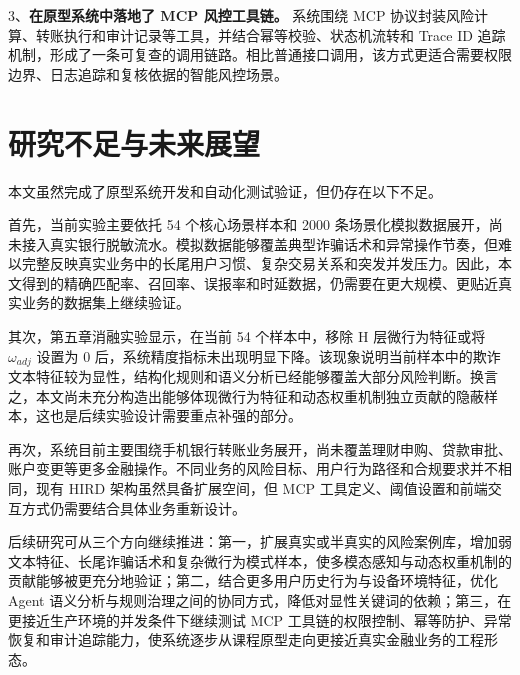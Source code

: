 \documentclass{xduugthesis}
\begin{document}
3、\textbf{在原型系统中落地了 MCP 风控工具链。} 系统围绕 MCP 协议封装风险计算、转账执行和审计记录等工具，并结合幂等校验、状态机流转和 Trace ID 追踪机制，形成了一条可复查的调用链路。相比普通接口调用，该方式更适合需要权限边界、日志追踪和复核依据的智能风控场景。

\section{研究不足与未来展望}

本文虽然完成了原型系统开发和自动化测试验证，但仍存在以下不足。

首先，当前实验主要依托 54 个核心场景样本和 2000 条场景化模拟数据展开，尚未接入真实银行脱敏流水。模拟数据能够覆盖典型诈骗话术和异常操作节奏，但难以完整反映真实业务中的长尾用户习惯、复杂交易关系和突发并发压力。因此，本文得到的精确匹配率、召回率、误报率和时延数据，仍需要在更大规模、更贴近真实业务的数据集上继续验证。

其次，第五章消融实验显示，在当前 54 个样本中，移除 H 层微行为特征或将 $\omega_{adj}$ 设置为 0 后，系统精度指标未出现明显下降。该现象说明当前样本中的欺诈文本特征较为显性，结构化规则和语义分析已经能够覆盖大部分风险判断。换言之，本文尚未充分构造出能够体现微行为特征和动态权重机制独立贡献的隐蔽样本，这也是后续实验设计需要重点补强的部分。

再次，系统目前主要围绕手机银行转账业务展开，尚未覆盖理财申购、贷款审批、账户变更等更多金融操作。不同业务的风险目标、用户行为路径和合规要求并不相同，现有 HIRD 架构虽然具备扩展空间，但 MCP 工具定义、阈值设置和前端交互方式仍需要结合具体业务重新设计。

后续研究可从三个方向继续推进：第一，扩展真实或半真实的风险案例库，增加弱文本特征、长尾诈骗话术和复杂微行为模式样本，使多模态感知与动态权重机制的贡献能够被更充分地验证；第二，结合更多用户历史行为与设备环境特征，优化 Agent 语义分析与规则治理之间的协同方式，降低对显性关键词的依赖；第三，在更接近生产环境的并发条件下继续测试 MCP 工具链的权限控制、幂等防护、异常恢复和审计追踪能力，使系统逐步从课程原型走向更接近真实金融业务的工程形态。
\end{document}
